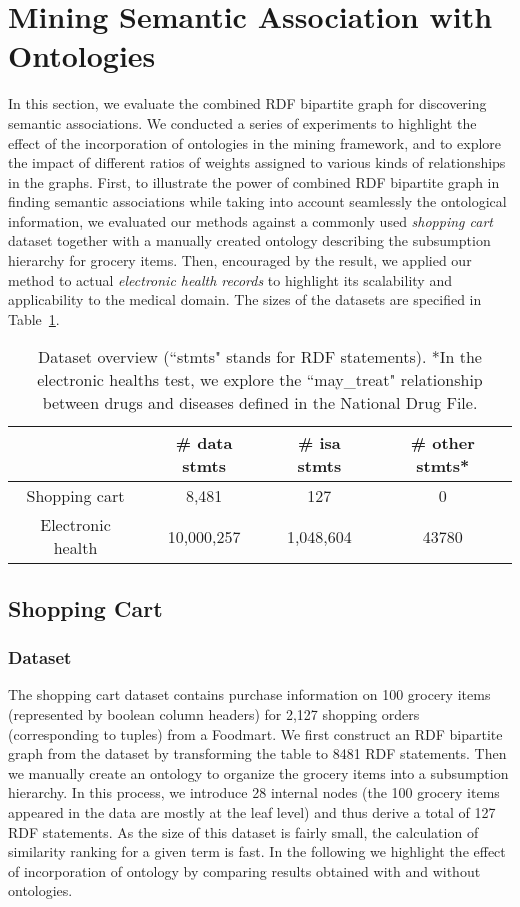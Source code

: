 \section{Mining Semantic Association with Ontologies}
In this section, we evaluate the combined RDF bipartite graph for discovering semantic associations. We conducted a series of experiments to highlight the effect of the incorporation of ontologies in the mining framework, and to explore the impact of different ratios of weights assigned to various kinds of relationships in the graphs. First, to illustrate the power of combined RDF bipartite graph in finding semantic associations while taking into account seamlessly the ontological information, we evaluated our methods against a commonly used \emph{shopping cart} dataset together with a manually created ontology describing the subsumption hierarchy for grocery items.  Then, encouraged by the result, we applied our method to actual \emph{electronic health records} to highlight its scalability and applicability to the medical domain. The sizes of the datasets are specified in Table~\ref{tbl:exp_overview}.

\begin{table}[tbh]\scriptsize
\begin{center}
\begin{tabular}{c|c|c|c}
\hline
    & \# data stmts & \# isa stmts & \# other stmts* \\
    \hline
  Shopping cart     &  8,481       & 127       &    0\\
  Electronic health &  10,000,257  & 1,048,604 &    43780\\
  \hline
\end{tabular}
\end{center}
\caption[Overview of the test cases.]{\label{tbl:exp_overview} Dataset overview (``stmts" stands for RDF statements). *In the electronic healths test, we explore the ``may\_treat" relationship between drugs and diseases defined in the National Drug File.}
\end{table}


\subsection{Shopping Cart}
\subsubsection{Dataset}
The shopping cart dataset contains purchase information on 100 grocery items (represented by boolean column headers) for 2,127 shopping orders (corresponding to tuples) from a Foodmart. We first construct an RDF bipartite graph from the dataset by transforming the table to 8481 RDF statements. Then we manually create an ontology to organize the grocery items into a subsumption hierarchy. In this process, we introduce 28 internal nodes (the 100 grocery items appeared in the data are mostly at the leaf level) and thus derive a total of 127 RDF statements. As the size of this dataset is fairly small, the calculation of similarity ranking for a given term is fast. In the following we highlight the effect of incorporation of ontology by comparing results obtained with and without ontologies.



